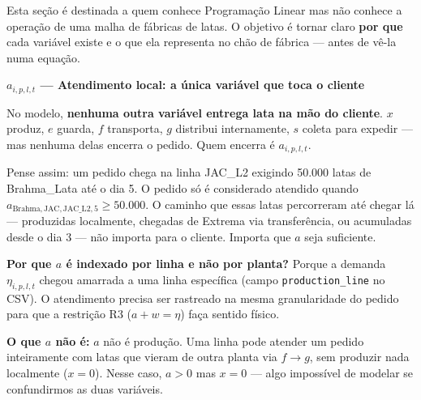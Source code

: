 \documentclass[12pt, a4paper]{article}
\begin{document}
Esta se\c{c}\~{a}o \'{e} destinada a quem conhece Programa\c{c}\~{a}o Linear mas n\~{a}o
conhece a opera\c{c}\~{a}o de uma malha de f\'{a}bricas de latas. O objetivo \'{e} tornar
claro \textbf{por que} cada vari\'{a}vel existe e o que ela representa no ch\~{a}o de f\'{a}brica
--- antes de v\^{e}-la numa equa\c{c}\~{a}o.

\vspace{6pt}
\begin{mdframed}[style=destaque]
\textbf{\color{ballblue}$a_{i,p,l,t}$ --- Atendimento local: a \'{u}nica vari\'{a}vel que toca o cliente}

\medskip
No modelo, \textbf{nenhuma outra vari\'{a}vel entrega lata na m\~{a}o do cliente}.
$x$ produz, $e$ guarda, $f$ transporta, $g$ distribui internamente, $s$ coleta para expedir ---
mas nenhuma delas encerra o pedido. Quem encerra \'{e} $a_{i,p,l,t}$.

\medskip
Pense assim: um pedido chega na linha JAC\_L2 exigindo 50.000 latas de Brahma\_Lata at\'{e}
o dia 5. O pedido s\'{o} \'{e} considerado atendido quando $a_{\text{Brahma},\text{JAC},\text{JAC\_L2},5}
\geq 50.000$. O caminho que essas latas percorreram at\'{e} chegar l\'{a} --- produzidas
localmente, chegadas de Extrema via transfer\^{e}ncia, ou acumuladas desde o dia 3 ---
n\~{a}o importa para o cliente. Importa que $a$ seja suficiente.

\medskip
\textbf{Por que $a$ \'{e} indexado por linha e n\~{a}o por planta?}
Porque a demanda $\eta_{i,p,l,t}$ chegou amarrada a uma linha espec\'{i}fica
(campo \texttt{production\_line} no CSV). O atendimento precisa ser rastreado
na mesma granularidade do pedido para que a restri\c{c}\~{a}o R3 ($a + w = \eta$)
fa\c{c}a sentido f\'{i}sico.

\medskip
\textbf{O que $a$ n\~{a}o \'{e}:} $a$ n\~{a}o \'{e} produ\c{c}\~{a}o. Uma linha pode atender
um pedido inteiramente com latas que vieram de outra planta via $f \to g$,
sem produzir nada localmente ($x = 0$). Nesse caso, $a > 0$ mas $x = 0$ --- algo
imposs\'{i}vel de modelar se confundirmos as duas vari\'{a}veis.
\end{mdframed}
\end{document}
